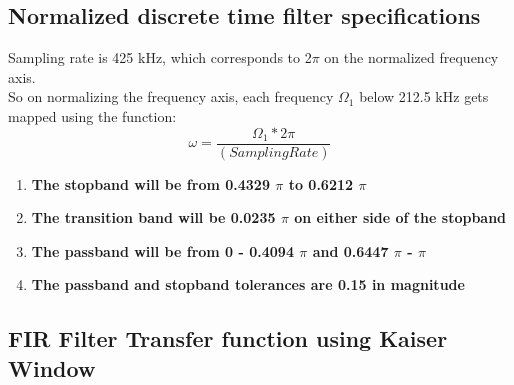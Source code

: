 \documentclass[12pt]{article}
\begin{document}
\subsection{Normalized discrete time filter specifications}
Sampling rate is 425 kHz, which corresponds to 2$\pi$ on the normalized frequency axis.
\\So on normalizing the frequency axis, each frequency $\Omega_1$ below 212.5 kHz gets mapped using the function:
\begin{equation}
    \omega=\frac{\Omega_1 * 2 \pi}{(Sampling Rate)}
\end{equation}
\begin{enumerate}
    \item \textbf{The stopband will be from 0.4329 $\pi$ to 0.6212 $\pi$}
    \item \textbf{The transition band will be 0.0235 $\pi$ on either side of the stopband}
    \item \textbf{The passband will be from 0 - 0.4094 $\pi$ and 0.6447 $\pi$ - $\pi$} 
    \item \textbf{The passband and stopband tolerances are 0.15 in magnitude}

\end{enumerate}

\subsection{FIR Filter Transfer function using Kaiser
Window}
\end{document}
